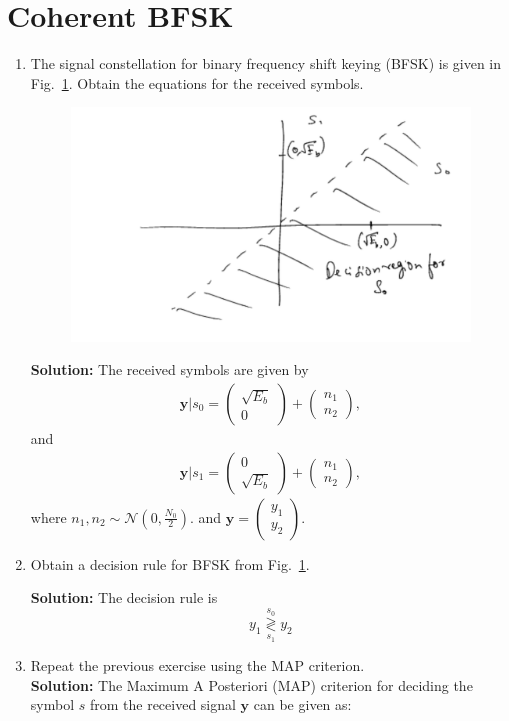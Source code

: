 \documentclass[12pt]{book}
\newcommand\figref{Fig.~\ref}
\newcommand{\solution}{\noindent \textbf{Solution: }}
\providecommand{\dec}[2]{\ensuremath{\overset{#1}{\underset{#2}{\gtrless}}}}
\newcommand{\myvec}[1]{\ensuremath{\begin{pmatrix}#1\end{pmatrix}}}
\providecommand{\gauss}[2]{\mathcal{N}\ensuremath{\left(#1,#2\right)}}
\begin{document}
\section{Coherent BFSK}
\begin{enumerate}
\item
The signal constellation for binary frequency shift keying (BFSK) is given in \figref{fig:bfsk_const}.
Obtain the equations for the received symbols.
\begin{figure}[H]
\centering
\includegraphics[width=\columnwidth]{./figs/6/2.pdf}
\caption{}
\label{fig:bfsk_const}
\end{figure}
\solution
The received symbols are given by
\begin{align}
\mathbf{y}|s_0 = 
\myvec{
\sqrt{E_b} \\
0
}
+
\myvec{
 n_{1}\\
n_{2}
},
\end{align}
and 
\begin{align}
\mathbf{y}|s_1 = 
\myvec{
0\\
\sqrt{E_b} 
}
+
\myvec{
n_{1}\\
 n_{2}
},
\end{align}
where $n_1,n_2 \sim \gauss{0}{\frac{N_0}{2}}$. and
$
\mathbf{y} = 
\myvec{
y_{1}\\
 y_{2}
}
$.
\item
Obtain a decision rule for BFSK from \figref{fig:bfsk_const}.

\solution The decision rule is
\begin{equation}
y_1 \dec{s_0}{s_1} y_2
\end{equation}
\item
Repeat the previous exercise using the MAP criterion.\\
\solution
The Maximum A Posteriori (MAP) criterion for deciding the symbol $s$ from the received signal $\mathbf{y}$ can be given as:


\end{enumerate}
\end{document}
